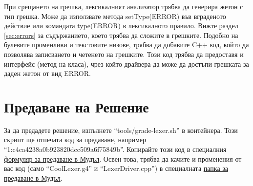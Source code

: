 \documentclass[11pt]{article}
\begin{document}
При срещането на грешка, лексикалният анализатор трябва да генерира жетон с тип грешка.
Може да използвате метода setType(ERROR) във вграденото действие или командата type(ERROR) в лексикалното правило.
Вижте раздел \ref{sec:errors} за съдържанието, което трябва да сложите в грешките.
Подобно на булевите променливи и текстовите низове, трябва да добавите C++ код, който да позволява записването и четенето на грешките.
Този код трябва да предоставя и интерфейс (метод на класа), чрез който драйвера да може да достъпи грешката за даден жетон от вид ERROR.

\section{Предаване на Решение}

За да предадете решение, изпълнете ``tools/grade-lexer.sh'' в контейнера.
Този скрипт ще отпечата код за предаване, например ``1:c4ca4238a0b923820dcc509a6f75849b''.
Копирайте този код в специалния \href{https://learn.fmi.uni-sofia.bg/mod/quiz/view.php?id=358624}{формуляр за предаване в Мудъл}.
Освен това, трябва да качите и променения от вас код (само ``CoolLexer.g4'' и ``LexerDriver.cpp'') в специалната \href{https://learn.fmi.uni-sofia.bg/mod/publication/view.php?id=359465}{папка за предаване в Мудъл}.

\renewcommand{\notesname}{Бележки от Текста}
\theendnotes
\end{document}
